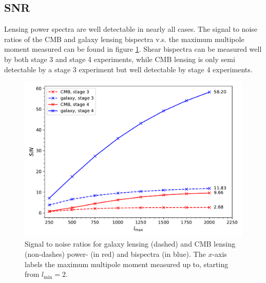 \documentclass[11pt]{article} %
\begin{document}
\subsection{SNR}
Lensing power spectra are well detectable in nearly all cases. 
The signal to noise ratios of the CMB and galaxy lensing bispectra v.s. the maximum multipole moment measured can be found in figure \ref{fig:snrplots}. Shear bispectra can be measured well by both stage 3 and stage 4 experiments, while CMB lensing is only semi detectable by a stage 3 experiment but well detectable by stage 4 experiments.
\begin{figure}
    \includegraphics[width=\textwidth]{figures/snrplots.pdf}
    \caption{Signal to noise ratios for galaxy lensing (dashed) and CMB lensing (non-dashes) power- (in red) and bispectra (in blue). The $x$-axis labels the maximum multipole moment measured up to, starting from $l_{\min}=2$.}
    \label{fig:snrplots}
\end{figure}
\end{document}
